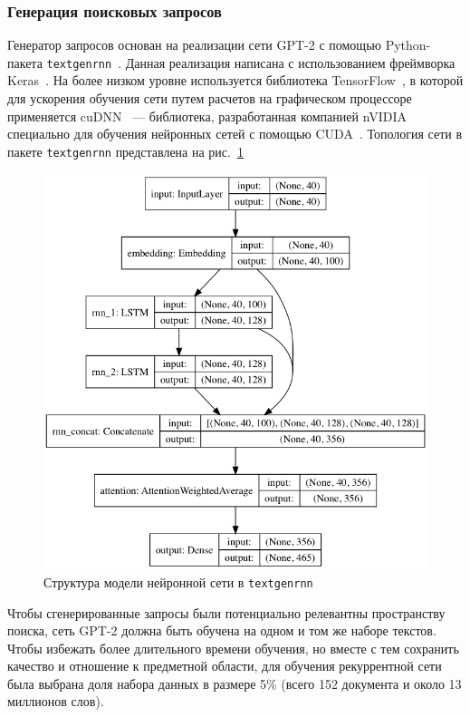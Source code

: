\subsubsection{Генерация поисковых запросов}
Генератор запросов основан на реализации сети GPT-2 с помощью Python-пакета \texttt{textgenrnn}~\cite{TextgenRNN2020}. Данная 
реализация написана с использованием фреймворка Keras~\cite{chollet2015keras}. На более низком уровне используется библиотека
TensorFlow~\cite{tensorflow2015-whitepaper}, в которой для ускорения обучения сети путем расчетов на графическом процессоре
применяется cuDNN~\cite{DBLP:journals/corr/ChetlurWVCTCS14} --- библиотека, разработанная компанией nVIDIA специально для 
обучения нейронных сетей с помощью CUDA~\cite{cuda}. Топология сети в пакете \texttt{textgenrnn} представлена на рис.~\ref{fig:default}

\begin{figure}
    \centerline{\includegraphics[scale=0.5]{default_model.png}}
    \caption{Структура модели нейронной сети в \texttt{textgenrnn}}\label{fig:default}
\end{figure}

Чтобы сгенерированные запросы были потенциально релевантны пространству поиска, сеть GPT-2 должна быть обучена на одном и том же
наборе текстов. Чтобы избежать более длительного времени обучения, но вместе с тем сохранить качество и отношение к предметной области,
для обучения рекуррентной сети была выбрана доля набора данных в размере 5\% (всего 152 документа и около 13 миллионов слов).

